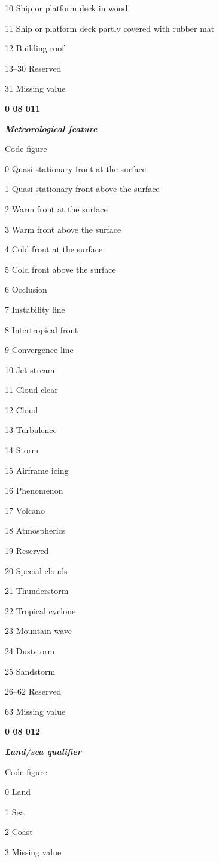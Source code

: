 10 Ship or platform deck in wood

11 Ship or platform deck partly covered with rubber mat

12 Building roof

13--30 Reserved

31 Missing value

\textbf{0 08 011}

\emph{\textbf{Meteorological feature}}

Code figure

0 Quasi-stationary front at the surface

1 Quasi-stationary front above the surface

2 Warm front at the surface

3 Warm front above the surface

4 Cold front at the surface

5 Cold front above the surface

6 Occlusion

7 Instability line

8 Intertropical front

9 Convergence line

10 Jet stream

11 Cloud clear

12 Cloud

13 Turbulence

14 Storm

15 Airframe icing

16 Phenomenon

17 Volcano

18 Atmospherics

19 Reserved

20 Special clouds

21 Thunderstorm

22 Tropical cyclone

23 Mountain wave

24 Duststorm

25 Sandstorm

26--62 Reserved

63 Missing value

\textbf{0 08 012}

\emph{\textbf{Land/sea qualifier}}

Code figure

0 Land

1 Sea

2 Coast

3 Missing value

